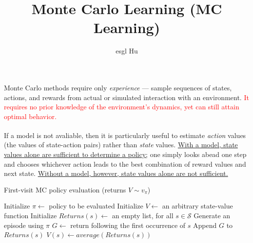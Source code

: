\documentclass[12pt,a4paper]{article}
\begin{document}
\title{Monte Carlo Learning (MC Learning)}
\author{esgl Hu}
\maketitle
\paragraph{}Monte Carlo methods require only \textit{experience} --- sample sequences of states, actions, and rewards from actual or simulated interaction with an environment. \textcolor{red}{It requires no prior knowledge of the environment's dynamics, yet can still attain optimal behavior.}
\paragraph{}If a model is not avaliable, then it is particularly useful to estimate \textit{action} values (the values of state-action pairs) rather than \textit{state} values. \uline{With a model, state values alone are sufficient to determine a policy;} one simply looks abead one step and chooses whichever action leads to the best combination of reward values and next state. \uline{Without a model, however, state values alone are not sufficient.}

\begin{algorithm}
	\caption{First-visit MC policy evaluation (returns $V \sim v_{\pi}$)}
	\begin{algorithmic}
	\State Initialize $\pi \leftarrow$ policy to be evaluated
	\State Initialize $V \leftarrow$ an arbitrary state-value function
	\State Initialize $Returns(s) \leftarrow$ an empty list, for all $s \in \mathcal{S}$
	\State Generate an episode using $\pi$
		\State $G \leftarrow$ return following the first occurrence of $s$
		\State Append $G$ to $Returns(s)$
		\State $V(s) \leftarrow average(Returns(s))$
	\EndFor
	\EndWhile
	\end{algorithmic}

\end{algorithm}



\end{document}
